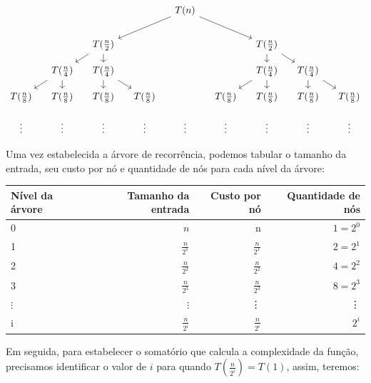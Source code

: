 \[\begin{tikzcd}[sep=small]
		&&&& {T(n)} \\
		\\
		&& {T(\frac{n}{2})} &&&& {T(\frac{n}{2})} \\
		& {T(\frac{n}{4})} & {T(\frac{n}{4})} &&&& {T(\frac{n}{4})} & {T(\frac{n}{4})} \\
		{T(\frac{n}{8})} & {T(\frac{n}{8})} & {T(\frac{n}{8})} & {T(\frac{n}{8})} && {T(\frac{n}{8})} & {T(\frac{n}{8})} & {T(\frac{n}{8})} & {T(\frac{n}{8})} \\
		\vdots & \vdots & \vdots & \vdots & \vdots & \vdots & \vdots & \vdots & \vdots
		\arrow[from=1-5, to=3-3]
		\arrow[from=1-5, to=3-7]
		\arrow[from=3-3, to=4-2]
		\arrow[from=3-3, to=4-3]
		\arrow[from=3-7, to=4-7]
		\arrow[from=3-7, to=4-8]
		\arrow[from=4-2, to=5-1]
		\arrow[from=4-2, to=5-2]
		\arrow[from=4-3, to=5-3]
		\arrow[from=4-3, to=5-4]
		\arrow[from=4-7, to=5-6]
		\arrow[from=4-7, to=5-7]
		\arrow[from=4-8, to=5-8]
		\arrow[from=4-8, to=5-9]
	\end{tikzcd}\]
\FloatBarrier

Uma vez estabelecida a árvore de recorrência, podemos tabular o tamanho da entrada, seu custo por nó e quantidade de nós para cada nível da árvore:


\begin{table}[h!]
	\centering
	\begin{tabular}{lrrr}
		\toprule
		Nível da árvore & Tamanho da entrada & Custo por nó    & Quantidade de nós \\
		\midrule
		0               & $n$                & n               & $1 = 2^0$         \\
		1               & $\frac{n}{2^1}$    & $\frac{n}{2^1}$ & $2 = 2^1$         \\
		2               & $\frac{n}{2^2}$    & $\frac{n}{2^2}$ & $4 = 2^2$         \\
		3               & $\frac{n}{2^3}$    & $\frac{n}{2^3}$ & $8 = 2^3$         \\
		$\vdots$        & $\vdots$           & \vdots          & \vdots            \\
		i               & $\frac{n}{2^i}$    & $\frac{n}{2^i}$ & $2^i$             \\
		\bottomrule
	\end{tabular}
\end{table}
\FloatBarrier

Em seguida, para estabelecer o somatório que calcula a complexidade da função, precisamos identificar o valor de $i$ para quando $T(\frac{n}{2^i}) = T(1)$, assim, teremos:

